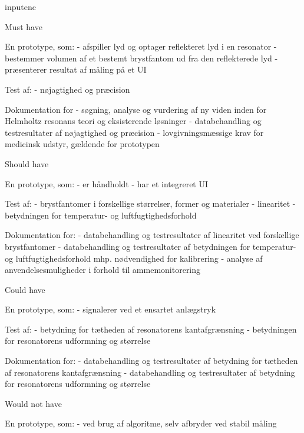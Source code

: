 
\usepackage{utf8}{inputenc}


Must have

En prototype, som:
- afspiller lyd og optager reflekteret lyd i en resonator
- bestemmer volumen af et bestemt brystfantom ud fra den reflekterede lyd 
- præsenterer resultat af måling på et UI

Test af:
- nøjagtighed og præcision 

Dokumentation for
- søgning, analyse og vurdering af ny viden inden for Helmholtz resonans teori og eksisterende løsninger   
- databehandling og testresultater af nøjagtighed og præcision 
- lovgivningsmæssige krav for medicinsk udstyr, gældende for prototypen 
 
 
Should have 

En prototype, som: 
- er håndholdt  
- har et integreret UI

Test af: 
- brystfantomer i forskellige størrelser, former og materialer
- linearitet 
- betydningen for temperatur- og luftfugtighedsforhold 

Dokumentation for: 
- databehandling og testresultater af linearitet ved forskellige brystfantomer
- databehandling og testresultater af betydningen for temperatur- og luftfugtighedsforhold mhp. nødvendighed for kalibrering
- analyse af anvendelsesmuligheder i forhold til ammemonitorering

Could have 

En prototype, som:
- signalerer ved et ensartet anlægstryk 

Test af: 
- betydning for tætheden af resonatorens kantafgrænsning
- betydningen for resonatorens udformning og størrelse

Dokumentation for: 
- databehandling og testresultater af betydning for tætheden af resonatorens kantafgrænsning
- databehandling og testresultater af betydning for resonatorens udformning og størrelse

Would not have 

En prototype, som:
- ved brug af algoritme, selv afbryder ved stabil måling 
